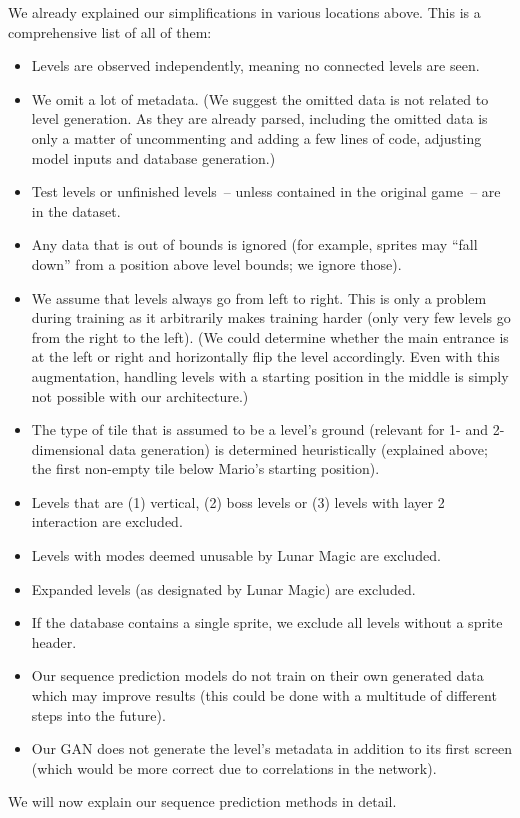 We already explained our simplifications in various locations above.
This is a comprehensive list of all of them:
\begin{itemize}
\item Levels are observed independently, meaning no connected levels
  are seen.
\item We omit a lot of metadata. (We suggest the omitted data is not
  related to level generation. As they are already parsed, including
  the omitted data is only a matter of uncommenting and adding a few
  lines of code, adjusting model inputs and database generation.)
\item Test levels or unfinished levels~-- unless contained in the
  original game~-- are in the dataset.
\item Any data that is out of bounds is ignored (for example, sprites
  may ``fall down'' from a position above level bounds; we ignore
  those).
\item We assume that levels always go from left to right. This is only
  a problem during training as it arbitrarily makes training harder
  (only very few levels go from the right to the left). (We could
  determine whether the main entrance is at the left or right and
  horizontally flip the level accordingly. Even with this
  augmentation, handling levels with a starting position in the middle
  is simply not possible with our architecture.)
\item The type of tile that is assumed to be a level's ground
  (relevant for 1- and 2-dimensional data generation) is determined
  heuristically (explained above; the first non-empty tile below
  Mario's starting position).
\item Levels that are (1) vertical, (2) boss levels or (3)
  levels with layer 2 interaction are excluded.
\item Levels with modes deemed unusable by Lunar Magic are excluded.
\item Expanded levels (as designated by Lunar Magic) are excluded.
\item If the database contains a single sprite, we exclude all levels
  without a sprite header.
\item Our sequence prediction models do not train on their own
  generated data which may improve results (this could be done with a
  multitude of different steps into the future).
\item Our GAN does not generate the level's metadata in addition to
  its first screen (which would be more correct due to correlations in
  the network).
\end{itemize}

We will now explain our sequence prediction methods in detail.


